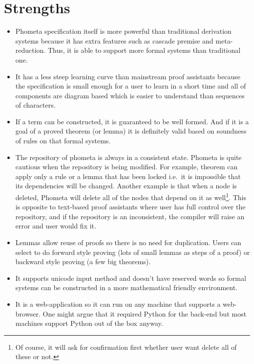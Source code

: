 \documentclass[master.tex]{subfiles}
\begin{document}
\section{Strengths}

\begin{itemize}
\item Phometa specification itself is more powerful than traditional derivation
  systems because it has extra features such as cascade premise and
  meta-reduction. Thus, it is able to support more formal systems than
  traditional one.
\item It has a less steep learning curve than mainstream proof assistants
  because the specification is small enough for a user to learn in a short time
  and all of components are diagram based which is easier to understand than
  sequences of characters.
\item If a term can be constructed, it is guaranteed to be well formed. And if
  it is a goal of a proved theorem (or lemma) it is definitely valid based on
  soundness of rules on that formal systems.
\item The repository of phometa is always in a consistent state. Phometa is
  quite cautious when the repository is being modified. For example, theorem can
  apply only a rule or a lemma that has been locked i.e.\ it is impossible that
  its dependencies will be changed. Another example is that when a node is
  deleted, Phometa will delete all of the nodes that depend on it as
  well\footnote{Of course, it will ask for confirmation first whether user want
    delete all of these or not.}. This is opposite to text-based proof
  assistants where user has full control over the repository, and if the
  repository is an inconsistent, the compiler will raise an error and user would
  fix it.
\item Lemmas allow reuse of proofs so there is no need for duplication. Users
  can select to do forward style proving (lots of small lemmas as steps of a
  proof) or backward style proving (a few big theorems).
\item It supports unicode input method and doesn't have reserved words so formal
  systems can be constructed in a more mathematical friendly environment.
\item It is a web-application so it can run on any machine that supports a
  web-browser. One might argue that it required Python for the back-end but most
  machines support Python out of the box anyway.
\end{itemize}
\end{document}
